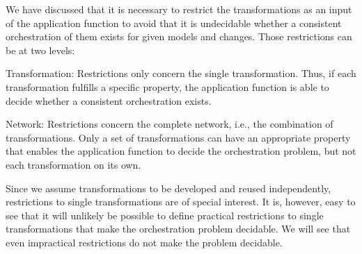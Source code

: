 We have discussed that it is necessary to restrict the transformations as an input of the application function to avoid that it is undecidable whether a consistent orchestration of them exists for given models and changes.
Those restrictions can be at two levels:
\begin{properdescription}
    \item[Transformation:] Restrictions only concern the single transformation. Thus, if each transformation fulfills a specific property, the application function is able to decide whether a consistent orchestration exists.
    \item[Network:] Restrictions concern the complete network, i.e., the combination of transformations. Only a set of transformations can have an appropriate property that enables the application function to decide the orchestration problem, but not each transformation on its own.
\end{properdescription}

Since we assume transformations to be developed and reused independently, restrictions to single transformations are of special interest.
It is, however, easy to see that it will unlikely be possible to define practical restrictions to single transformations that make the orchestration problem decidable.
We will see that even impractical restrictions do not make the problem decidable.




